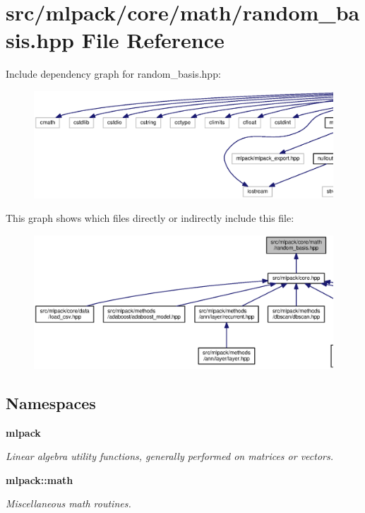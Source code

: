 \section{src/mlpack/core/math/random\+\_\+basis.hpp File Reference}
\label{random__basis_8hpp}
Include dependency graph for random\+\_\+basis.\+hpp\+:
\nopagebreak
\begin{figure}[H]
\begin{center}
\leavevmode
\includegraphics[width=350pt]{random__basis_8hpp__incl}
\end{center}
\end{figure}
This graph shows which files directly or indirectly include this file\+:
\nopagebreak
\begin{figure}[H]
\begin{center}
\leavevmode
\includegraphics[width=350pt]{random__basis_8hpp__dep__incl}
\end{center}
\end{figure}
\subsection*{Namespaces}
\begin{DoxyCompactItemize}
\item 
 {\bf mlpack}
\begin{DoxyCompactList}\small\item\em Linear algebra utility functions, generally performed on matrices or vectors. \end{DoxyCompactList}\item 
 {\bf mlpack\+::math}
\begin{DoxyCompactList}\small\item\em Miscellaneous math routines. \end{DoxyCompactList}\end{DoxyCompactItemize}
